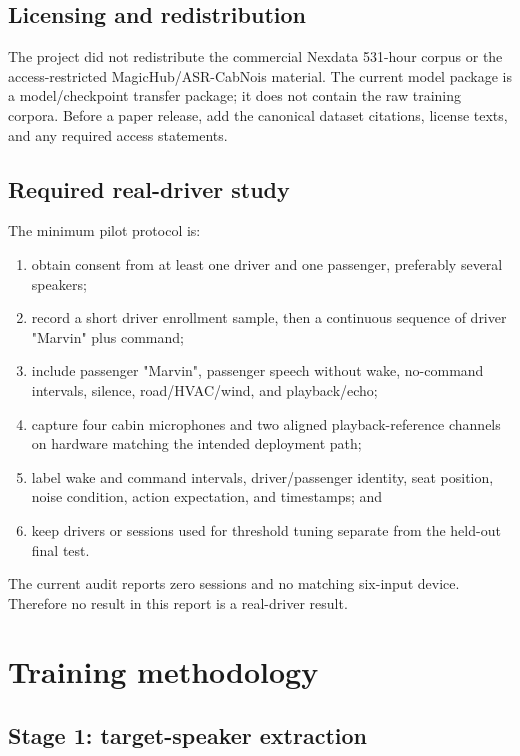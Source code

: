 \documentclass[11pt,a4paper]{article}
\begin{document}
\subsection{Licensing and redistribution}

The project did not redistribute the commercial Nexdata 531-hour corpus or
the access-restricted MagicHub/ASR-CabNois material. The current model
package is a model/checkpoint transfer package; it does not contain the raw
training corpora. Before a paper release, add the canonical dataset
citations, license texts, and any required access statements.

\subsection{Required real-driver study}

The minimum pilot protocol is:

\begin{enumerate}[leftmargin=*]
  \item obtain consent from at least one driver and one passenger, preferably
        several speakers;
  \item record a short driver enrollment sample, then a continuous sequence
        of driver "Marvin" plus command;
  \item include passenger "Marvin", passenger speech without wake, no-command
        intervals, silence, road/HVAC/wind, and playback/echo;
  \item capture four cabin microphones and two aligned playback-reference
        channels on hardware matching the intended deployment path;
  \item label wake and command intervals, driver/passenger identity, seat
        position, noise condition, action expectation, and timestamps; and
  \item keep drivers or sessions used for threshold tuning separate from the
        held-out final test.
\end{enumerate}

The current audit reports zero sessions and no matching six-input device.
Therefore no result in this report is a real-driver result.

\section{Training methodology}

\subsection{Stage 1: target-speaker extraction}
\end{document}
